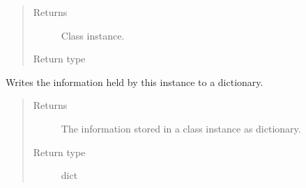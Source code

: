 \documentclass[letterpaper,10pt,english]{sphinxmanual}
\begin{document}
\begin{fulllineitems}
\begin{fulllineitems}
\begin{quote}
\begin{description}
\item[{Returns}] \leavevmode
{} \textendash{} Class instance.

\item[{Return type}] \leavevmode
{\hyperref[\detokenize{qsim:qsim.optimization_data.OptimizationResult}]{}}

\end{description}\end{quote}

\end{fulllineitems}


\begin{fulllineitems}
\label{\detokenize{qsim:qsim.optimization_data.OptimizationResult.to_dict}}
Writes the information held by this instance to a dictionary.
\begin{quote}\begin{description}
\item[{Returns}] \leavevmode
{} \textendash{} The information stored in a class instance as dictionary.

\item[{Return type}] \leavevmode
dict

\end{description}\end{quote}

\end{fulllineitems}


\end{fulllineitems}

\end{document}
